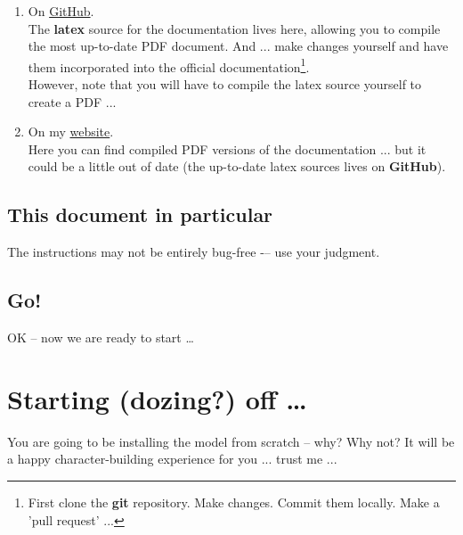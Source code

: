 \vspace{1mm}
\begin{enumerate}[noitemsep]
\setlength{\itemindent}{.2in}
\item On \href{https://github.com/genie-model/cookiedoc}{GitHub}.
\\The \textbf{latex} source for the documentation lives here, allowing you to compile the most up-to-date PDF document. And ... make changes yourself and have them incorporated into the official documentation\footnote{First clone the \textbf{git} repository. Make changes. Commit them locally. Make a 'pull request' ...}.
\\However, note that you will have to compile the latex source yourself to create a PDF ...
\item On my \href{http://www.seao2.info/mymuffin.html}{website}.
\\Here you can find compiled PDF versions of the documentation ... but it could be a little out of date (the up-to-date latex sources lives on \textbf{GitHub}).
\end{enumerate}


\subsection*{This document in particular}

The instructions  may not be entirely bug-free -– use your judgment.


\subsection*{Go!}

OK – now we are ready to start …

\newpage

\section{Starting (dozing?) off …}

You are going to be installing the model from scratch – why? Why not? It will be a happy character-building experience for you ... trust me ...



